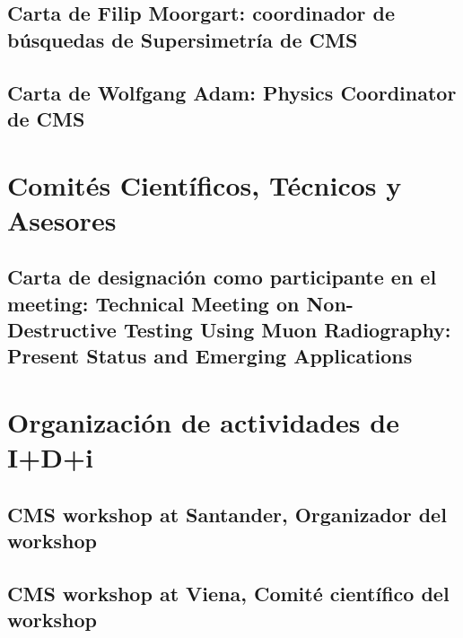 \documentclass[a4paper, 11pt, twoside, openright]{report}
\begin{document}
\subsection{Carta de Filip Moorgart: coordinador de búsquedas de Supersimetría de CMS}

\subsection{Carta de Wolfgang Adam: Physics Coordinator de CMS}




\section{Comités Científicos, Técnicos y Asesores}
\subsection{Carta de designación como participante en el meeting: Technical Meeting on Non-Destructive Testing Using Muon Radiography: Present Status and Emerging Applications}



\section{Organización de actividades de I+D+i}

\subsection{CMS workshop at Santander, Organizador del workshop}


\subsection{CMS workshop at Viena, Comité científico del workshop}

\end{document}
